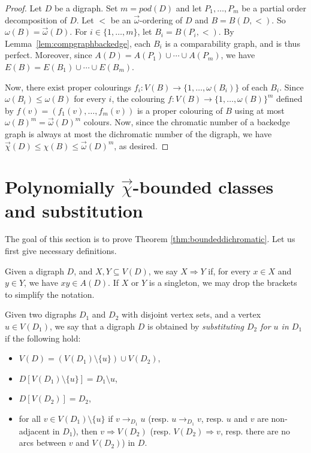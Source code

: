 \documentclass{article}
\newcommand{\dic}{\vec\chi}
\newcommand{\diomega}{\vec\omega}
\renewcommand{\le}{\leqslant}
\begin{document}
\begin{proof}
    Let $D$ be a digraph. Set $m=pod(D)$ and let $P_{1},\ldots,P_{m}$ be a partial order decomposition of $D$.  
    Let $<$ be an $\diomega$-ordering of $D$ and $B=B(D,<)$. So $\omega(B) = \diomega(D)$. For $i \in \{1, \ldots, m\}$, let $B_i=B(P_i, <)$. By Lemma~\ref{lem:compgraphbackedge}, each $B_i$ is a comparability graph, and is thus perfect.  Moreover, since
    $A(D)=A(P_1)\cup\cdots\cup A(P_m)$, we have
    $E(B)=E(B_1)\cup\cdots\cup E(B_m)$.

    Now, there exist proper colourings $f_i:V(B)\to \{1,\ldots,\omega(B_i)\}$ of each $B_i$.
    Since $\omega(B_i)\le \omega(B)$ for every $i$, the colouring
    $f:V(B)\to \{1,\ldots,\omega(B)\}^m$ defined by $f(v)=(f_1(v),\dots,f_m(v))$
    is a proper colouring of $B$ using at most $\omega(B)^m=\diomega(D)^m$ colours.
    Now, since the chromatic number of a backedge graph is always at most the dichromatic number of the digraph, we have $\dic(D)\le \chi(B)\le \diomega(D)^m$, as desired.
\end{proof}



\section{Polynomially $\dic$-bounded classes and substitution}
\label{sec:tournamentsofboundeddic}


The goal of this section is to prove Theorem \ref{thm:boundeddichromatic}. 
Let us first give necessary definitions. 

Given a digraph $D$, and $X,Y \subseteq V(D)$,  we say $X \Rightarrow Y$ if, for every $x \in X$ and $y \in Y$, we have $xy \in A(D)$. If $X$ or $Y$ is a singleton, we may drop the brackets to simplify the notation.

Given two digraphs $D_1$ and $D_2$ with disjoint vertex sets, and a vertex
$u \in V(D_1)$, we say that a digraph $D$ is obtained by \textit{substituting $D_2$ for $u$ in $D_1$} if the following hold:

\begin{itemize}
    \item $V(D) = (V(D_1) \setminus \{u\}) \cup V(D_2)$,
    \item $D[V(D_1) \setminus \{u\}] = D_1 \setminus u$,
    \item $D[V(D_2)] = D_2$,
    \item for all $v \in V(D_1) \setminus \{u\}$ if $v \to_{D_1} u$ (resp. $u \to_{D_1} v$, resp. $u$ and $v$ are non-adjacent in $D_1$), then $v \Rightarrow V(D_2)$ (resp. $V(D_2) \Rightarrow v$, resp. there are no arcs between $v$ and $V(D_2)$) in $D$.
\end{itemize}
\end{document}

